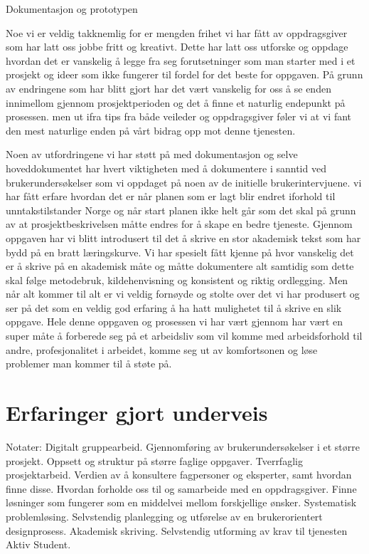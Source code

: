 Dokumentasjon og prototypen 

Noe vi er veldig takknemlig for er mengden frihet vi har fått av oppdragsgiver som har latt oss jobbe fritt og kreativt. Dette har latt oss utforske og oppdage hvordan det er vanskelig å legge fra seg forutsetninger som man starter med i et prosjekt og ideer som ikke fungerer til fordel for det beste for oppgaven. På grunn av endringene som har blitt gjort har det vært vanskelig for oss å se enden innimellom gjennom prosjektperioden og det å finne et naturlig endepunkt på prosessen. men ut ifra tips fra både veileder og oppdragsgiver føler vi at vi fant den mest naturlige enden på vårt bidrag opp mot denne tjenesten.

Noen av utfordringene vi har støtt på med dokumentasjon og selve hoveddokumentet har hvert viktigheten med å dokumentere i sanntid ved brukerundersøkelser som vi oppdaget på noen av de initielle brukerintervjuene. vi har fått erfare hvordan det er når planen som er lagt blir endret iforhold til unntakstilstander Norge og når start planen ikke helt går som det skal på grunn av at prosjektbeskrivelsen måtte endres for å skape en bedre tjeneste. Gjennom oppgaven har vi blitt introdusert til det å skrive en stor akademisk tekst som har bydd på en bratt læringskurve. Vi har spesielt fått kjenne på hvor vanskelig det er å skrive på en akademisk måte og måtte dokumentere alt samtidig som dette skal følge metodebruk, kildehenvisning og konsistent og riktig ordlegging. Men når alt kommer til alt er vi veldig fornøyde og stolte over det vi har produsert og ser på det som en veldig god erfaring å ha hatt mulighetet til å skrive en slik oppgave. Hele denne oppgaven og prosessen vi har vært gjennom har vært en super måte å forberede seg på et arbeidsliv som vil komme med arbeidsforhold til andre, profesjonalitet i arbeidet, komme seg ut av komfortsonen og løse problemer man kommer til å støte på.


\section{Erfaringer gjort underveis}
Notater:
Digitalt gruppearbeid.
Gjennomføring av brukerundersøkelser i et større prosjekt.
Oppsett og struktur på større faglige oppgaver.
Tverrfaglig prosjektarbeid.
Verdien av å konsultere fagpersoner og eksperter, samt hvordan finne disse.
Hvordan forholde oss til og samarbeide med en oppdragsgiver.
Finne løsninger som fungerer som en middelvei mellom forskjellige ønsker.
Systematisk problemløsing.
Selvstendig planlegging og utførelse av en brukerorientert designprosess.
Akademisk skriving.
Selvstendig utforming av krav til tjenesten Aktiv Student.

